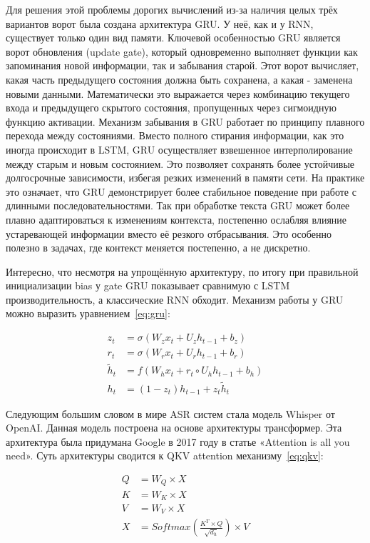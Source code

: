 Для решения этой проблемы дорогих вычислений из-за наличия целых трёх вариантов ворот была создана архитектура GRU.
У неё, как и у RNN, существует только один вид памяти.
Ключевой особенностью GRU является ворот обновления (update gate), который одновременно выполняет функции как запоминания новой информации, так и забывания старой.
Этот ворот вычисляет, какая часть предыдущего состояния должна быть сохранена, а какая - заменена новыми данными.
Математически это выражается через комбинацию текущего входа и предыдущего скрытого состояния, пропущенных через сигмоидную функцию активации.
Механизм забывания в GRU работает по принципу плавного перехода между состояниями. Вместо полного стирания информации, как это иногда происходит в LSTM, GRU осуществляет взвешенное интерполирование между старым и новым состоянием. Это позволяет сохранять более устойчивые долгосрочные зависимости, избегая резких изменений в памяти сети.
На практике это означает, что GRU демонстрирует более стабильное поведение при работе с длинными последовательностями.
Так при обработке текста GRU может более плавно адаптироваться к изменениям контекста, постепенно ослабляя влияние устаревающей информации вместо её резкого отбрасывания.
Это особенно полезно в задачах, где контекст меняется постепенно, а не дискретно.

Интересно, что несмотря на упрощённую архитектуру, по итогу при правильной инициализации bias у gate GRU показывает сравнимую с LSTM производительность, а классические RNN обходит.
Механизм работы у GRU можно выразить уравнением~\ref{eq:gru}:

\begin{equation}
  \begin{aligned}
    z_t &= \sigma(W_z x_t + U_z h_{t-1} + b_z) \\
    r_t &= \sigma(W_r x_t + U_r h_{t-1} + b_r) \\
    \tilde{h}_t &= f(W_h x_t + r_t \circ U_h h_{t-1} + b_h) \\
    h_t &= (1 - z_t) h_{t-1} + z_t \tilde{h}_t
  \end{aligned}
  \label{eq:gru}
\end{equation}

Следующим большим словом в мире ASR систем стала модель Whisper от OpenAI.
Данная модель построена на основе архитектуры трансформер.
Эта архитектура была придумана Google в 2017 году в статье «Attention is all you need».
Суть архитектуры сводится к QKV attention механизму~\ref{eq:qkv}:

\begin{equation}
  \begin{aligned}
    Q &= W_Q \times X \\
    K &= W_K \times X \\
    V &= W_V \times X \\
    X &= Softmax(\frac{K^T \times Q}{\sqrt{d_h}}) \times V
  \end{aligned}
  \label{eq:qkv}
\end{equation}

